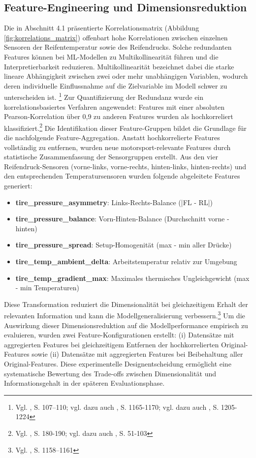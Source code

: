\subsection{Feature-Engineering und Dimensionsreduktion}

Die in Abschnitt 4.1 präsentierte Korrelationsmatrix (Abbildung \ref{fig:korrelations_matrix}) offenbart hohe Korrelationen zwischen einzelnen Sensoren der Reifentemperatur sowie des Reifendrucks. Solche redundanten Features können bei \ac{ML}-Modellen zu Multikollinearität führen und die Interpretierbarkeit reduzieren. Multikollinearität bezeichnet dabei die starke lineare Abhängigkeit zwischen zwei oder mehr unabhängigen Variablen, wodurch deren individuelle Einflussnahme auf die Zielvariable im Modell schwer zu unterscheiden ist. \footnote{Vgl. \cite{James2021}, S. 107–110; vgl. dazu auch \cite{Guyon2003}, S. 1165-1170; vgl. dazu auch \cite{YuLiu2004}, S. 1205-1224} 
Zur Quantifizierung der Redundanz wurde ein korrelationsbasiertes Verfahren angewendet: Features mit einer absoluten Pearson-Korrelation über 0,9 zu anderen Features wurden als hochkorreliert klassifiziert.\footnote{Vgl. \cite{Kuhn2019}, S. 180-190; vgl. dazu auch \cite{Hall1999}, S. 51-103} Die Identifikation dieser Feature-Gruppen bildet die Grundlage für die nachfolgende Feature-Aggregation.
Anstatt hochkorrelierte Features vollständig zu entfernen, wurden neue motorsport-relevante Features durch statistische Zusammenfassung der Sensorgruppen erstellt. Aus den vier Reifendruck-Sensoren (vorne-links, vorne-rechts, hinten-links, hinten-rechts) und den entsprechenden Temperatursensoren wurden folgende abgeleitete Features generiert:

\begin{itemize}
  \item \textbf{tire\_pressure\_asymmetry}: Links-Rechts-Balance (|FL - RL|)
  \item \textbf{tire\_pressure\_balance}: Vorn-Hinten-Balance (Durchschnitt vorne - hinten)
  \item \textbf{tire\_pressure\_spread}: Setup-Homogenität (max - min aller Drücke)
  \item \textbf{tire\_temp\_ambient\_delta}: Arbeitstemperatur relativ zur Umgebung
  \item \textbf{tire\_temp\_gradient\_max}: Maximales thermisches Ungleichgewicht (max - min Temperaturen)
\end{itemize} Diese Transformation reduziert die Dimensionalität bei gleichzeitigem Erhalt der relevanten Information und kann die Modellgeneralisierung verbessern.\footnote{Vgl. \cite{Guyon2003}, S. 1158–1161}
Um die Auswirkung dieser Dimensionsreduktion auf die Modellperformance empirisch zu evaluieren, wurden zwei Feature-Konfigurationen erstellt: (i) Datensätze mit aggregierten Features bei gleichzeitigem Entfernen der hochkorrelierten Original-Features sowie (ii) Datensätze mit aggregierten Features bei Beibehaltung aller Original-Features. Diese experimentelle Designentscheidung ermöglicht eine systematische Bewertung des Trade-offs zwischen Dimensionalität und Informationsgehalt in der späteren Evaluationsphase.

